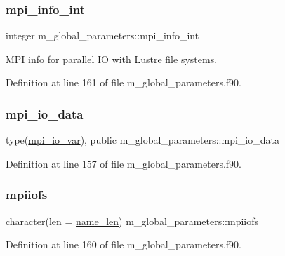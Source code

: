 \subsubsection{\texorpdfstring{mpi\+\_\+info\+\_\+int}{mpi\_info\_int}}
{\footnotesize\ttfamily integer m\+\_\+global\+\_\+parameters\+::mpi\+\_\+info\+\_\+int}



M\+PI info for parallel IO with Lustre file systems. 



Definition at line 161 of file m\+\_\+global\+\_\+parameters.\+f90.

\mbox{\label{namespacem__global__parameters_ad80f68aac31aa898ab2d7729f60e375f}} 
\subsubsection{\texorpdfstring{mpi\+\_\+io\+\_\+data}{mpi\_io\_data}}
{\footnotesize\ttfamily type(\hyperlink{structm__derived__types_1_1mpi__io__var}{mpi\+\_\+io\+\_\+var}), public m\+\_\+global\+\_\+parameters\+::mpi\+\_\+io\+\_\+data}



Definition at line 157 of file m\+\_\+global\+\_\+parameters.\+f90.

\mbox{\label{namespacem__global__parameters_ad4713c1e89eaa8fac3bb2181ba87b192}} 
\subsubsection{\texorpdfstring{mpiiofs}{mpiiofs}}
{\footnotesize\ttfamily character(len = \hyperlink{namespacem__global__parameters_ac8252b115e717c6f1c8595be6f897df7}{name\+\_\+len}) m\+\_\+global\+\_\+parameters\+::mpiiofs}



Definition at line 160 of file m\+\_\+global\+\_\+parameters.\+f90.

\mbox{\label{namespacem__global__parameters_adc35ba450a192812db36f1d6659d64e6}} 
